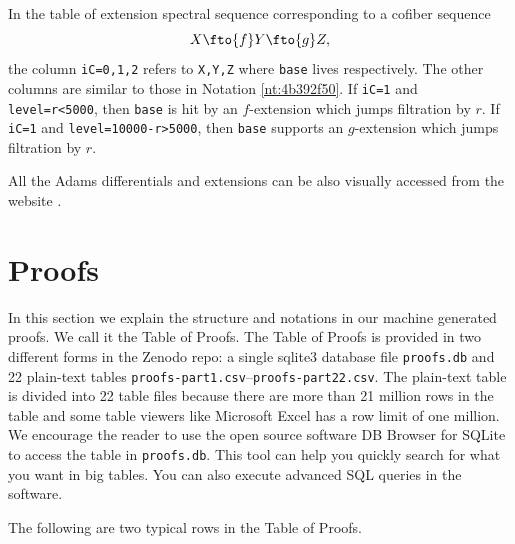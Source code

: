 \documentclass{amsart}
\numberwithin{equation}{section}
\begin{document}
\begin{notation}
    In the table of extension spectral sequence corresponding to a cofiber sequence
    $$X\fto{f} Y\fto{g} Z,$$
    the column \verb|iC=0,1,2| refers to \verb|X,Y,Z| where \verb|base| lives respectively. The other columns are similar to those in Notation \ref{nt:4b392f50}. If \verb|iC=1| and \verb|level=r<5000|, then \verb|base| is hit by an $f$-extension which jumps filtration by $r$. If \verb|iC=1| and \verb|level=10000-r>5000|, then \verb|base| supports an $g$-extension which jumps filtration by $r$.
\end{notation}

\begin{remark}
    All the Adams differentials and extensions can be also visually accessed from the website \cite{LinPlot}.
\end{remark}


\section{Proofs}\label{sec:proofs}
In this section we explain the structure and notations in our machine generated proofs. We call it the Table of Proofs. The Table of Proofs is provided in two different forms in the Zenodo repo: a single sqlite3 database file \verb|proofs.db| and 22 plain-text tables \verb|proofs-part1.csv|--\verb|proofs-part22.csv|. The plain-text table is divided into 22 table files because there are more than 21 million rows in the table and some table viewers like Microsoft Excel has a row limit of one million. We encourage the reader to use the open source software DB Browser for SQLite to access the table in \verb|proofs.db|. This tool can help you quickly search for what you want in big tables. You can also execute advanced SQL queries in the software.

The following are two typical rows in the Table of Proofs.
\begin{table}[h]\caption{Two rows from the Table of Proofs}\label{tb:proofs}
\end{table}\vspace{5pt}
\end{document}
